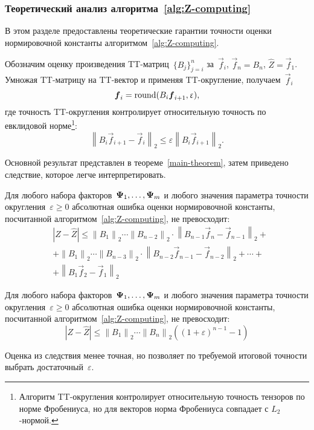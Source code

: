 \subsubsection{Теоретический анализ алгоритма~\ref{alg:Z-computing}}
В этом разделе предоставлены теоретические гарантии точности оценки нормировочной константы алгоритмом~\ref{alg:Z-computing}.

Обозначим оценку произведения TT\hyp{}матриц~$\{B_j\}_{j = i}^n$ за~$\vec{f}_i$, $\vec{f}_n = B_n$, $\widehat{Z} = \vec{f}_1$. Умножая TT\hyp{}матрицу на TT\hyp{}вектор и применяя TT\hyp{}округление, получаем~$\vec{f}_i$
$$
\boldsymbol{f}_i = \operatorname{round}(B_i \boldsymbol{f}_{i + 1}, \upvarepsilon),
$$
где точность TT\hyp{}округления контролирует относительную точность по евклидовой норме\footnote{Алгоритм TT\hyp{}округления контролирует относительную точность тензоров по норме Фробениуса, но для векторов норма Фробениуса совпадает с $L_2$-нормой.}:
\begin{equation}
\label{main-algorithm-rounding-inequality}
\left \| B_i \vec{f}_{i + 1} - \vec{f}_i \right \|_2 \leq \varepsilon \left \| B_i \vec{f}_{i + 1} \right \|_2.
\end{equation}

Основной результат представлен в теореме~\ref{main-theorem}, затем приведено следствие, которое легче интерпретировать.
\begin{theorem}
\label{main-theorem}
	Для любого набора факторов~$\boldsymbol{\Psi}_1, \ldots, \boldsymbol{\Psi}_m$ и любого значения параметра точности округления~$\varepsilon \geq 0$ абсолютная ошибка оценки нормировочной константы, посчитанной алгоритмом~\ref{alg:Z-computing}, не превосходит:
	\begin{equation}
	\begin{aligned}
	\label{tough-abs-err-bound}
	&\left |Z - \widehat{Z}  \right | \leq
	\left \| B_1 \right \|_2 \dotsm \left \| B_{n-2} \right \|_2 \cdot \left \| B_{n-1} \vec{f}_n - \vec{f}_{n-1} \right \|_2 + \\
	&+\left \| B_1 \right \|_2 \dotsm \left \| B_{n-3} \right \|_2 \cdot \left \| B_{n-2} \vec{f}_{n-1} - \vec{f}_{n-2} \right \|_2 + \dotsb + \\
	&+\left \| B_1 \vec{f}_2 - \vec{f}_1 \right \|_2
	\end{aligned}
	\end{equation}
\end{theorem}

\begin{corollary}
\label{main-theorem-corollary}
	Для любого набора факторов~$\boldsymbol{\Psi}_1, \ldots, \boldsymbol{\Psi}_m$ и любого значения параметра точности округления~$\varepsilon \geq 0$ абсолютная ошибка оценки нормировочной константы, посчитанной алгоритмом~\ref{alg:Z-computing}, не превосходит:
	\begin{equation}
		\label{epsilon-inequality}
		\left |Z - \widehat{Z}\right |  \leq \left \| B_1 \right \|_2 \dotsm \left \| B_n \right \|_2 ((1 + \varepsilon)^{n-1} - 1)
	\end{equation}
\end{corollary}
Оценка из следствия менее точная, но позволяет по требуемой итоговой точности выбрать достаточный~$\varepsilon$.

